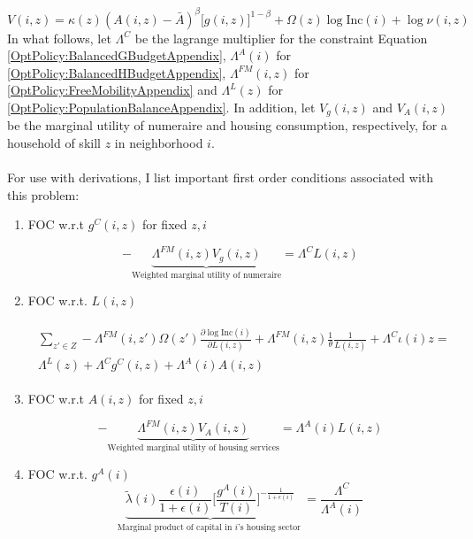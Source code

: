 \documentclass[12pt]{article}
\begin{document}
	 \begin{equation*}
	 	V(i, z) = \kappa(z)(A(i, z) - \bar{A})^{\beta}\big[g(i, z)\big]^{1-\beta} + \Omega(z) \log \text{Inc}(i) + \log \nu(i, z)
	 \end{equation*}
	 In what follows, let $\Lambda^{C}$ be the lagrange multiplier for the constraint Equation \eqref{OptPolicy:BalancedGBudgetAppendix}, $\Lambda^{A}(i)$ for \eqref{OptPolicy:BalancedHBudgetAppendix},  $\Lambda^{FM}(i, z)$ for \eqref{OptPolicy:FreeMobilityAppendix} and $\Lambda^{L}(z)$ for \eqref{OptPolicy:PopulationBalanceAppendix}. In addition, let $V_{g}(i, z)$ and $V_{A}(i, z)$ be the marginal utility of numeraire and housing consumption, respectively, for a household of skill $z$ in neighborhood $i$. 
		
	\paragraph*{}
	For use with derivations,  I list important first order conditions associated with this problem:
	
		\begin{enumerate}
		\item FOC w.r.t $g^{C}(i, z)$ for fixed $z, i$
		
		\begin{equation}\label{Appendix:FOC_g}
			-\underbrace{\Lambda^{FM}(i, z)V_{g}(i, z)}_{\text{Weighted marginal utility of numeraire}}  = \Lambda^{C}L(i, z)
		\end{equation}
		
		\item FOC w.r.t. $L(i, z)$ 
		
		\begin{align}\label{Appendix:FOC_L}
			\begin{split}
			\sum_{z' \in Z}-\Lambda^{FM}(i, z')\Omega(z')\frac{\partial \log \text{Inc}(i)}{\partial L(i, z)} + \Lambda^{FM}(i, z)\frac{1}{\theta}\frac{1}{L(i, z)} + \Lambda^{C}\iota(i)z  = \\ \Lambda^{L}(z) + \Lambda^{C}g^{C}(i, z) + \Lambda^{A}(i)A(i, z)
			\end{split}
		\end{align}
	
		\item FOC w.r.t $A(i, z)$ for fixed $z, i$
		
		\begin{equation}\label{Appendix:FOC_A}
		-	\underbrace{\Lambda^{FM}(i, z)V_{A}(i, z)}_{\text{Weighted marginal utility of housing services}} = \Lambda^{A}(i)L(i, z)
		\end{equation}
		
		\item FOC w.r.t. $g^{A}(i)$ 
		\begin{equation}\label{Appendix:FOC_A_cap}
			\underbrace{ \tilde{\lambda}(i)\frac{\epsilon(i)}{1 + \epsilon(i)} \bigg[\frac{g^{A}(i)}{T(i)} \bigg]^{-\frac{1}{1 + \epsilon(i)}}}_{\text{Marginal product of capital in $i$'s housing sector }} = \frac{\Lambda^{C}}{\Lambda^{A}(i)}
		\end{equation}
		
	\end{enumerate}
	
\end{document}
